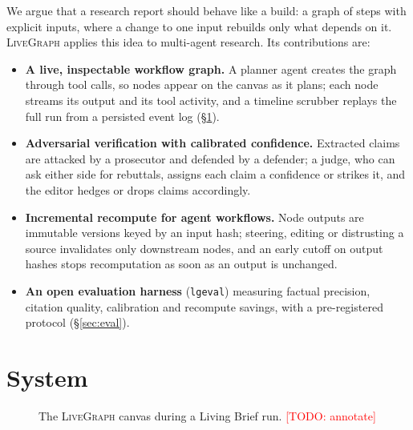 \documentclass[11pt]{article}
\newcommand{\todo}[1]{\textcolor{red}{[TODO: #1]}}
\newcommand{\sys}{\textsc{LiveGraph}}
\begin{document}
We argue that a research report should behave like a build: a graph of steps with explicit inputs, where a
change to one input rebuilds only what depends on it. \sys{} applies this idea to multi-agent research.
Its contributions are:
\begin{itemize}
  \item \textbf{A live, inspectable workflow graph.} A planner agent creates the graph through tool calls,
  so nodes appear on the canvas as it plans; each node streams its output and its tool activity, and a
  timeline scrubber replays the full run from a persisted event log (\S\ref{sec:system}).
  \item \textbf{Adversarial verification with calibrated confidence.} Extracted claims are attacked by a
  prosecutor and defended by a defender; a judge, who can ask either side for rebuttals, assigns each claim
  a confidence or strikes it, and the editor hedges or drops claims accordingly.
  \item \textbf{Incremental recompute for agent workflows.} Node outputs are immutable versions keyed by an
  input hash; steering, editing or distrusting a source invalidates only downstream nodes, and an early
  cutoff on output hashes stops recomputation as soon as an output is unchanged.
  \item \textbf{An open evaluation harness} (\texttt{lgeval}) measuring factual precision, citation quality,
  calibration and recompute savings, with a pre-registered protocol (\S\ref{sec:eval}).
\end{itemize}

\section{System}
\label{sec:system}
\begin{figure}[t]
  \centering
  \fbox{\parbox{0.95\linewidth}{\centering\small \todo{Screenshot: canvas mid-run with claims panel}}}
  \caption{The \sys{} canvas during a Living Brief run. \todo{annotate}}
  \label{fig:screenshot}
\end{figure}
\end{document}
